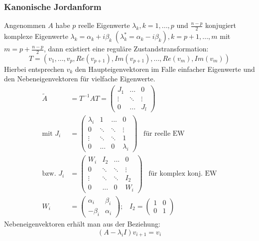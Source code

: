 \documentclass[a4paper,twocolumn,10pt]{article}
\begin{document}
\subsubsection{Kanonische Jordanform}
Angenommen $A$ habe $p$ reelle Eigenwerte $\lambda_k,k=1,...,p$ und $\frac{n-p}{2}$ konjugiert komplexe Eigenwerte $\lambda_k=\alpha_k+i\beta_k\;(\lambda_k^*=\alpha_k-i\beta_k),k=p+1,...,m$ mit $m=p+\frac{n-p}{2}$, dann existiert eine reguläre Zustandstransformation:
\begin{equation*}
T=(v_1,...,v_p,Re(v_{p+1}),Im(v_{p+1}),...,Re(v_m),Im(v_m))
\end{equation*}
Hierbei entsprechen $v_k$ den Haupteigenvektoren im Falle einfacher Eigenwerte und den Nebeneigenvektoren für vielfache Eigenwerte.
\begin{equation*}
\begin{split}
\tilde{A}&=T^{-1}AT=\begin{pmatrix}J_1 & ... & 0 \\ \vdots & \ddots & \vdots \\ 0 & ... & J_l\end{pmatrix}\\
\text{mit }J_i&=\begin{pmatrix}\lambda_i & 1 & ... & 0 \\ 0 & \ddots & \ddots & \vdots \\ \vdots & \ddots & \ddots & 1 \\ 0 & ... & 0 & \lambda_i\end{pmatrix}\;\;\;\text{für reelle EW}\\
\text{bzw. }J_i&=\begin{pmatrix}W_i & I_2 & ... & 0 \\ 0 & \ddots & \ddots & \vdots \\ \vdots & \ddots & \ddots & I_2 \\ 0 & ... & 0 & W_i\end{pmatrix}\;\;\;\text{für komplex konj. EW}\\
W_i&=\begin{pmatrix}\alpha_i & \beta_i \\ -\beta_i & \alpha_i\end{pmatrix};\;\;\;I_2=\begin{pmatrix}1 & 0 \\ 0 & 1\end{pmatrix}
\end{split}
\end{equation*}
Nebeneigenvektoren erhält man aus der Beziehung:
\begin{equation*}
(A-\lambda_iI)v_{i+1}=v_i
\end{equation*}
\end{document}
